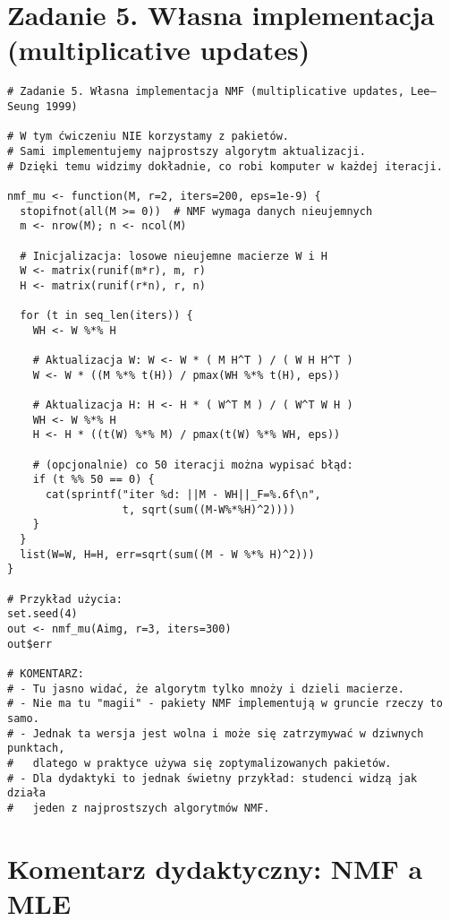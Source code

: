 \documentclass[12pt]{article}
\begin{document}
\section*{Zadanie 5. Własna implementacja (multiplicative updates)}
\begin{lstlisting}
# Zadanie 5. Własna implementacja NMF (multiplicative updates, Lee–Seung 1999)

# W tym ćwiczeniu NIE korzystamy z pakietów.
# Sami implementujemy najprostszy algorytm aktualizacji.
# Dzięki temu widzimy dokładnie, co robi komputer w każdej iteracji.

nmf_mu <- function(M, r=2, iters=200, eps=1e-9) {
  stopifnot(all(M >= 0))  # NMF wymaga danych nieujemnych
  m <- nrow(M); n <- ncol(M)
  
  # Inicjalizacja: losowe nieujemne macierze W i H
  W <- matrix(runif(m*r), m, r)
  H <- matrix(runif(r*n), r, n)
  
  for (t in seq_len(iters)) {
    WH <- W %*% H
    
    # Aktualizacja W: W <- W * ( M H^T ) / ( W H H^T )
    W <- W * ((M %*% t(H)) / pmax(WH %*% t(H), eps))
    
    # Aktualizacja H: H <- H * ( W^T M ) / ( W^T W H )
    WH <- W %*% H
    H <- H * ((t(W) %*% M) / pmax(t(W) %*% WH, eps))
    
    # (opcjonalnie) co 50 iteracji można wypisać błąd:
    if (t %% 50 == 0) {
      cat(sprintf("iter %d: ||M - WH||_F=%.6f\n",
                  t, sqrt(sum((M-W%*%H)^2))))
    }
  }
  list(W=W, H=H, err=sqrt(sum((M - W %*% H)^2)))
}

# Przykład użycia:
set.seed(4)
out <- nmf_mu(Aimg, r=3, iters=300)
out$err

# KOMENTARZ:
# - Tu jasno widać, że algorytm tylko mnoży i dzieli macierze.
# - Nie ma tu "magii" - pakiety NMF implementują w gruncie rzeczy to samo.
# - Jednak ta wersja jest wolna i może się zatrzymywać w dziwnych punktach,
#   dlatego w praktyce używa się zoptymalizowanych pakietów.
# - Dla dydaktyki to jednak świetny przykład: studenci widzą jak działa
#   jeden z najprostszych algorytmów NMF.

\end{lstlisting}


\section*{Komentarz dydaktyczny: NMF a MLE}
\end{document}
